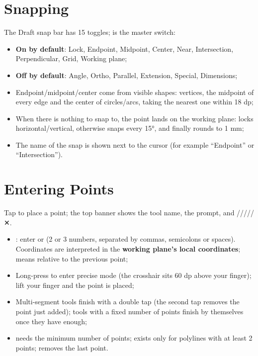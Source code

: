 \section{Snapping}

The Draft snap bar has 15 toggles;  is the master switch:

\begin{itemize}
  \item \textbf{On by default}: Lock, Endpoint, Midpoint, Center, Near, Intersection, Perpendicular,
        Grid, Working plane;
  \item \textbf{Off by default}: Angle, Ortho, Parallel, Extension, Special, Dimensions;
  \item Endpoint/midpoint/center come from visible shapes: vertices, the midpoint of every edge and
        the center of circles/arcs, taking the nearest one within 18 dp;
  \item When there is nothing to snap to, the point lands on the working plane:  locks
        horizontal/vertical, otherwise  snaps every 15°, and finally  rounds to
        1 mm;
  \item The name of the snap is shown next to the cursor (for example ``Endpoint'' or
        ``Intersection'').
\end{itemize}

\section{Entering Points}

Tap to place a point; the top banner shows the tool name, the prompt, and
/////✕.

\begin{itemize}
  \item {}: enter  or  (2 or 3 numbers, separated by commas,
        semicolons or spaces). Coordinates are interpreted in the \textbf{working plane's local
        coordinates};  means relative to the previous point;
  \item Long-press to enter precise mode (the crosshair sits 60 dp above your finger); lift your
        finger and the point is placed;
  \item Multi-segment tools finish with a double tap (the second tap removes the point just added);
        tools with a fixed number of points finish by themselves once they have enough;
  \item {} needs the minimum number of points;  exists only for polylines with at
        least 2 points;  removes the last point.
\end{itemize}

